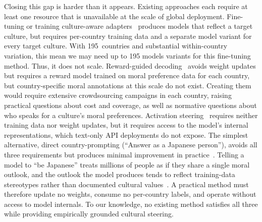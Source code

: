 \documentclass{article}
\begin{document}


Closing this gap is harder than it appears. Existing approaches each require at least one resource that is unavailable at the scale of global deployment.
%
Fine-tuning or training culture-aware adapters~\citep{li2024culturemanager, yao2024caredio} produces models that reflect a target culture, but requires per-country training data and a separate model variant for every target culture. With
195~countries and substantial within-country variation, this mean we may need up to 195 models variants for this fine-tuning method. Thus, it does not scale.
%
Reward-guided decoding~\citep{khanov2024args,
mudgal2024controlled} avoids weight updates but requires a reward model trained on moral preference data for each country, but country-specific moral annotations at this scale do not exist. Creating them would require extensive crowdsourcing campaigns in each country, raising practical questions about cost and coverage, as well as normative questions about who speaks for a culture's moral preferences.
%
Activation steering~\citep{arditi2025refusal,
zou2023representation} requires neither training data nor weight updates, but it requires access to the model's internal representations, which text-only API deployments do not expose.
%
The simplest alternative, direct country-prompting (``Answer as a Japanese person''), avoids all three requirements but produces minimal improvement in practice~\citep{jin2025multitp}. Telling a model to ``be Japanese'' treats millions of people as if they share a single moral outlook, and the outlook the model produces tends to reflect training-data stereotypes rather than documented cultural values~\citep{deshpande2023toxicity}.%
A practical method must therefore update no weights, consume no per-country labels, and operate without access to model internals. To our knowledge, no existing method satisfies all three while providing empirically grounded cultural steering.
\end{document}
